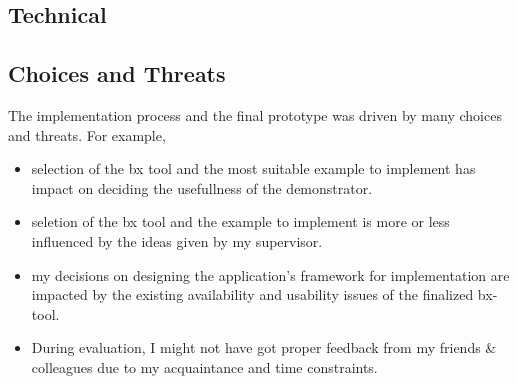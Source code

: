 \subsection{Technical}\label{subsec:technicalreq}

\subsection{Choices and Threats}\label{subsec:choicesthreats}
The implementation process and the final prototype was driven by many choices and threats. For example, 
\begin{itemize} 
	\item {selection of the bx tool and the most suitable example to implement has impact on deciding the usefullness of the demonstrator.}
	\item {seletion of the bx tool and the example to implement is more or less influenced by the ideas given by my supervisor.} 
	\item {my decisions on designing the application's framework for implementation are impacted by the existing availability and usability issues of the finalized bx-tool.}
	\item {During evaluation, I might not have got proper feedback from my friends \& colleagues due to my acquaintance and time constraints.}
\end{itemize}











